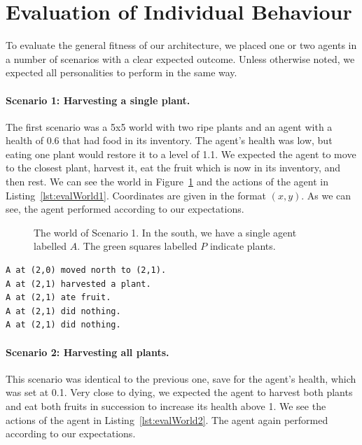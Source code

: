 \section{Evaluation of Individual Behaviour}

To evaluate the general fitness of our architecture, we placed one or two agents in a number of scenarios with a clear expected outcome. Unless otherwise noted, we expected all personalities to perform in the same way.

\paragraph{Scenario 1: Harvesting a single plant.} The first scenario was a 5x5 world with two ripe plants and an agent with a health of 0.6 that had food in its inventory. The agent's health was low, but eating one plant would restore it to a level of 1.1. We expected the agent to move to the closest plant, harvest it, eat the fruit which is now in its inventory, and then rest. We can see the world in Figure~\ref{fig:evalWorld1} and the actions of the agent in Listing~\ref{lst:evalWorld1}. Coordinates are given in the format $(x,y)$. As we can see, the agent performed according to our expectations.

\begin{figure}[t]
	\centering
	
	\caption{The world of Scenario 1. In the south, we have a single agent labelled $A$. The green squares labelled $P$ indicate plants.}
	\label{fig:evalWorld1}
\end{figure}

\begin{lstlisting}[caption=Actions in Scenario 1., label=lst:evalWorld1, float=t]
A at (2,0) moved north to (2,1).
A at (2,1) harvested a plant.
A at (2,1) ate fruit.
A at (2,1) did nothing.
A at (2,1) did nothing.
\end{lstlisting}

\paragraph{Scenario 2: Harvesting all plants.} This scenario was identical to the previous one, save for the agent's health, which was set at 0.1. Very close to dying, we expected the agent to harvest both plants and eat both fruits in succession to increase its health above 1. We see the actions of the agent in Listing~\ref{lst:evalWorld2}. The agent again performed according to our expectations.

